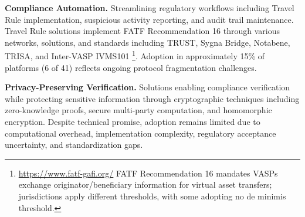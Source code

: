 \noindent\textbf{Compliance Automation.}
Streamlining regulatory workflows including Travel Rule implementation, suspicious activity reporting, and audit trail maintenance. Travel Rule solutions implement FATF Recommendation 16 through various networks, solutions, and standards including TRUST, Sygna Bridge, Notabene, TRISA, and Inter-VASP IVMS101 \footnote{\url{https://www.fatf-gafi.org/} FATF Recommendation 16 mandates VASPs exchange originator/beneficiary information for virtual asset transfers; jurisdictions apply different thresholds, with some adopting no de minimis threshold.}. Adoption in approximately 15\% of platforms (6 of 41) reflects ongoing protocol fragmentation challenges.

\noindent\textbf{Privacy-Preserving Verification.}
Solutions enabling compliance verification while protecting sensitive information through cryptographic techniques including zero-knowledge proofs, secure multi-party computation, and homomorphic encryption. Despite technical promise, adoption remains limited due to computational overhead, implementation complexity, regulatory acceptance uncertainty, and standardization gaps.
